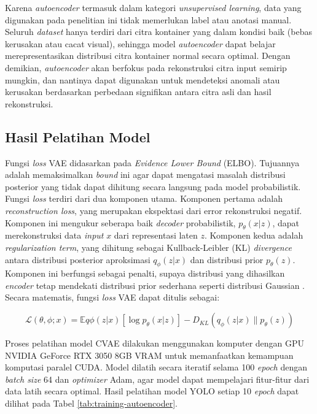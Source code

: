 Karena \textit{autoencoder} termasuk dalam kategori \textit{unsupervised
learning}, data yang digunakan pada penelitian ini tidak memerlukan
label atau anotasi manual. Seluruh \textit{dataset} hanya terdiri dari citra
kontainer yang dalam kondisi baik (bebas kerusakan atau cacat
visual), sehingga model \textit{autoencoder} dapat belajar merepresentasikan
distribusi citra kontainer normal secara optimal. Dengan demikian,
\textit{autoencoder} akan berfokus pada rekonstruksi citra input semirip
mungkin, dan nantinya dapat digunakan untuk mendeteksi anomali atau
kerusakan berdasarkan perbedaan signifikan antara citra asli dan
hasil rekonstruksi.

\vspace{1em}

\subsection{Hasil Pelatihan Model}

Fungsi \textit{loss} VAE didasarkan pada \textit{Evidence Lower
Bound} (ELBO). Tujuannya
adalah memaksimalkan \textit{bound} ini agar dapat mengatasi masalah
distribusi posterior yang tidak dapat dihitung secara langsung pada
model probabilistik. Fungsi \textit{loss} terdiri dari dua komponen utama.
Komponen pertama adalah \textit{reconstruction loss}, yang merupakan
ekspektasi dari error rekonstruksi negatif. Komponen ini mengukur
seberapa baik \textit{decoder} probabilistik, $p_\theta(x|z)$, dapat
merekonstruksi data \textit{input} $x$ dari representasi laten $z$. Komponen
kedua adalah \textit{regularization term}, yang dihitung sebagai
Kullback-Leibler (KL) \textit{divergence} antara distribusi posterior
aproksimasi $q_\phi(z|x)$ dan distribusi prior $p_\theta(z)$.
Komponen ini berfungsi sebagai penalti, supaya distribusi yang
dihasilkan \textit{encoder} tetap mendekati distribusi prior sederhana
seperti distribusi Gaussian \citep{26}. Secara matematis, fungsi \textit{loss}
VAE dapat ditulis sebagai:

\begin{equation}
  \mathcal{L}(\theta, \phi; x) = \mathbb{E}{q\phi(z|x)}[\log
  p_\theta(x|z)] - D_{KL}(q_\phi(z|x) \parallel p_\theta(z))
\end{equation}

Proses pelatihan model CVAE dilakukan
menggunakan komputer dengan GPU NVIDIA GeForce RTX 3050 8GB VRAM
untuk memanfaatkan kemampuan komputasi paralel CUDA. Model dilatih
secara iteratif selama 100 \textit{epoch} dengan
\textit{batch size} 64
dan \textit{optimizer} Adam, agar model dapat mempelajari fitur-fitur dari
data latih secara
optimal. Hasil pelatihan model YOLO setiap 10 \textit{epoch} dapat dilihat
pada Tabel \ref{tab:training-autoencoder}.

